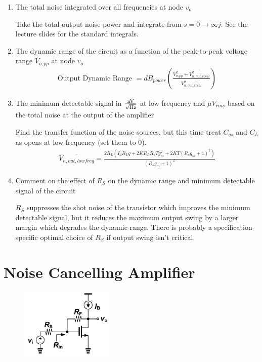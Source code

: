 \begin{enumerate}[label=(\alph*)]
  \item {\color{blue}The total noise integrated over all frequencies at node $v_o$}

    Take the total output noise power and integrate from $s = 0 \rightarrow \infty j$. See the lecture slides for the standard integrals.

  \item {\color{blue}The dynamic range of the circuit as a function of the peak-to-peak voltage range $V_{o,pp}$ at node $v_o$}
    \begin{align*}
      \text{Output Dynamic Range } = dB_{power} \left( \frac{V_{o,pp}^2 + \overline{V_{n, out, total}^2}}{\overline{V_{n, out, total}^2}} \right)
    \end{align*}

  \item {\color{blue}The minimum detectable signal in $\frac{\text{nV}}{\sqrt{\text{Hz}}}$ at low frequency and $\mu V_{rms}$ based on the total noise at the output of the amplifier}

    Find the transfer function of the noise sources, but this time treat $C_{gs}$ and $C_{L}$ as opens at low frequency (set them to 0).
    \begin{align*}
      \overline{V_{n,out,lowfreq}} = \frac{2 R_{L} \left(I_{d} R_{L} q + 2 K R_{L} R_{s} T g_{m}^{2} + 2 K T \left(R_{s} g_{m} + 1\right)^{2}\right)}{\left(R_{s} g_{m} + 1\right)^{2}}
    \end{align*}

  \item {\color{blue}Comment on the effect of $R_S$ on the dynamic range and minimum detectable signal of the circuit}

    $R_S$ suppresses the shot noise of the transistor which improves the minimum detectable signal, but it reduces the maximum output swing by a larger margin which degrades the dynamic range. There is probably a specification-specific optimal choice of $R_S$ if output swing isn't critical.
\end{enumerate}

\section{Noise Cancelling Amplifier}
\begin{figure}[H]
  \centering
  \includegraphics[width=0.4\textwidth]{figs/problem3.png}
\end{figure}

